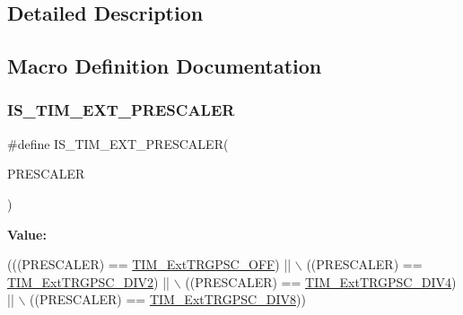 \subsection{Detailed Description}


\subsection{Macro Definition Documentation}
\mbox{\label{group___t_i_m___external___trigger___prescaler_ga615587e6aae397d9fe8166004e7324f2}} 
\subsubsection{\texorpdfstring{I\+S\+\_\+\+T\+I\+M\+\_\+\+E\+X\+T\+\_\+\+P\+R\+E\+S\+C\+A\+L\+ER}{IS\_TIM\_EXT\_PRESCALER}}
{\footnotesize\ttfamily \#define I\+S\+\_\+\+T\+I\+M\+\_\+\+E\+X\+T\+\_\+\+P\+R\+E\+S\+C\+A\+L\+ER(\begin{DoxyParamCaption}\item[{}]{P\+R\+E\+S\+C\+A\+L\+ER }\end{DoxyParamCaption})}

{\bfseries Value\+:}
\begin{DoxyCode}
(((PRESCALER) == \hyperlink{group___t_i_m___external___trigger___prescaler_ga1b21757d5d1b708edca7e20481797e96}{TIM\_ExtTRGPSC\_OFF}) || \(\backslash\)
                                         ((PRESCALER) == \hyperlink{group___t_i_m___external___trigger___prescaler_ga446ed7f1bc28bcb295c43886da582e47}{TIM\_ExtTRGPSC\_DIV2}) || \(\backslash\)
                                         ((PRESCALER) == \hyperlink{group___t_i_m___external___trigger___prescaler_ga1de0031af7654fac2f29705f1da146c6}{TIM\_ExtTRGPSC\_DIV4}) || \(\backslash\)
                                         ((PRESCALER) == \hyperlink{group___t_i_m___external___trigger___prescaler_gac2fe5014d69a93ce0a22b9f3f5a7d19a}{TIM\_ExtTRGPSC\_DIV8}))
\end{DoxyCode}


